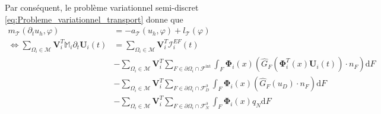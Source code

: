 \documentclass[11pt, a4paper, oneside]{report}
\begin{document}
Par conséquent, le problème variationnel semi-discret \eqref{eq:Probleme_variationnel_transport} donne que
\begin{equation} \label{eq:Developpement_formulation_variationnelle_transport}
    \begin{aligned}
        m_\mathcal{T}(\partial_t u_h, \varphi) &= -a_\mathcal{T}(u_h, \varphi) + l_\mathcal{T}(\varphi) \\
        \Leftrightarrow \sum_{\Omega_i \in \mathcal{M}} \bm{V}_i^T \mathbb{M}_i \partial_t \bm{U}_i(t) &= \sum_{\Omega_i \in \mathcal{M}} \bm{V}_i^T \bm{\mathcal{I}}_i^{EF}(t) \\
        & - \sum_{\Omega_i \in \mathcal{M}} \bm{V}_i^T \sum_{F \in \partial \Omega_i \cap \mathcal{F}^\text{int}} \int_F \bm{\Phi}_i(x) \left( \widehat{G}_F \left( \bm{\Phi}_i^T(x) \bm{U}_i(t) \right) \cdot n_F \right) \text{d}F \\
        & - \sum_{\Omega_i \in \mathcal{M}} \bm{V}_i^T \sum_{F \in \partial \Omega_i \cap \mathcal{F}_D^\partial} \int_F \bm{\Phi}_i(x) \left( \widehat{G}_F(u_D) \cdot n_F \right) \text{d}F \\
        & - \sum_{\Omega_i \in \mathcal{M}} \bm{V}_i^T \sum_{F \in \partial \Omega_i \cap \mathcal{F}_N^\partial} \int_F \bm{\Phi}_i(x) q_N \text{d}F
    \end{aligned}
\end{equation}
\end{document}
